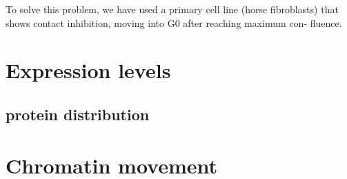 To solve this problem, we have used a primary cell line (horse fibroblasts)
that shows contact inhibition, moving into G0 after reaching maximum con-
fluence.



\section{Expression levels}




    \subsection{protein distribution}


\section{Chromatin movement}



